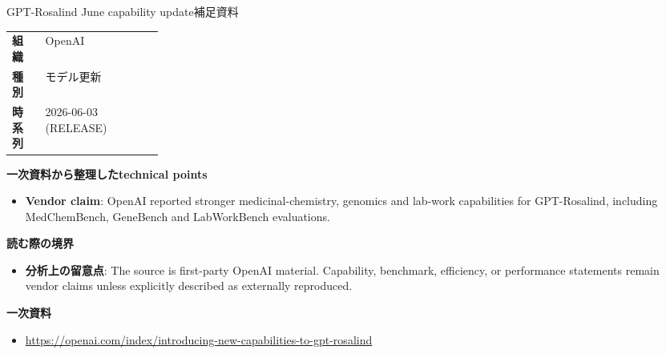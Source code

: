 \begin{technicalnote}{GPT-Rosalind June capability update}{補足資料}
\begin{tabularx}{\linewidth}{@{}>{\bfseries}p{0.22\linewidth}X@{}}
組織 & OpenAI \\
種別 & モデル更新 \\
時系列 & 2026-06-03 (RELEASE) \\
\end{tabularx}
\smallskip
{\bfseries 一次資料から整理したtechnical points}
\begin{itemize}[leftmargin=1.5em,itemsep=0.35em]
\item \textbf{Vendor claim}: OpenAI reported stronger medicinal-chemistry, genomics and lab-work capabilities for GPT-Rosalind, including MedChemBench, GeneBench and LabWorkBench evaluations.
\end{itemize}
{\bfseries 読む際の境界}
\begin{itemize}[leftmargin=1.5em,itemsep=0.35em]
\item \textbf{分析上の留意点}: The source is first-party OpenAI material. Capability, benchmark, efficiency, or performance statements remain vendor claims unless explicitly described as externally reproduced.
\end{itemize}
{\bfseries 一次資料}
\begingroup\sloppy
\begin{itemize}[leftmargin=1.5em,itemsep=0.25em]
\item {\scriptsize\url{https://openai.com/index/introducing-new-capabilities-to-gpt-rosalind}}
\end{itemize}
\endgroup
\end{technicalnote}
\medskip

